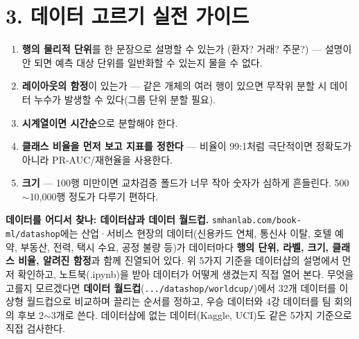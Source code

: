 \documentclass[12pt]{article}
\begin{document}
\newpage
\section*{3. 데이터 고르기 실전 가이드}
\begin{enumerate}
\item \textbf{행의 물리적 단위}를 한 문장으로 설명할 수 있는가
  (환자? 거래? 주문?) --- 설명이 안 되면 예측 대상 단위를
  일반화할 수 있는지 물을 수 없다.
\item \textbf{레이아웃의 함정}이 있는가 --- 같은 개체의 여러 행이
  있으면 무작위 분할 시 데이터 누수가 발생할 수 있다(그룹 단위
  분할 필요).
\item \textbf{시계열이면 시간순}으로 분할해야 한다.
\item \textbf{클래스 비율을 먼저 보고 지표를 정한다} --- 비율이
  99:1처럼 극단적이면 정확도가 아니라 PR-AUC/재현율을 사용한다.
\item \textbf{크기} --- 100행 미만이면 교차검증 폴드가 너무 작아
  숫자가 심하게 흔들린다. 500$\sim$10{,}000행 정도가 다루기 편하다.
\end{enumerate}

\vspace{4pt}
\noindent\textbf{데이터를 어디서 찾나: 데이터샵과 데이터 월드컵.}
\texttt{smhanlab.com/book-ml/datashop}에는 산업·서비스 현장의 데이터(신용카드 연체, 통신사 이탈, 호텔 예약, 부동산, 전력, 택시 수요, 공정 불량 등)가 데이터마다 \textbf{행의 단위, 라벨, 크기, 클래스 비율, 알려진 함정}과 함께 진열되어 있다. 위 5가지 기준을 데이터샵의 설명에서 먼저 확인하고, 노트북(.ipynb)을 받아 데이터가 어떻게 생겼는지 직접 열어 본다. 무엇을 고를지 모르겠다면 \textbf{데이터 월드컵}(\texttt{.../datashop/worldcup/})에서 32개 데이터를 이상형 월드컵으로 비교하며 끌리는 순서를 정하고, 우승 데이터와 4강 데이터를 팀 회의의 후보 2$\sim$3개로 쓴다. 데이터샵에 없는 데이터(Kaggle, UCI)도 같은 5가지 기준으로 직접 검사한다.
\end{document}
